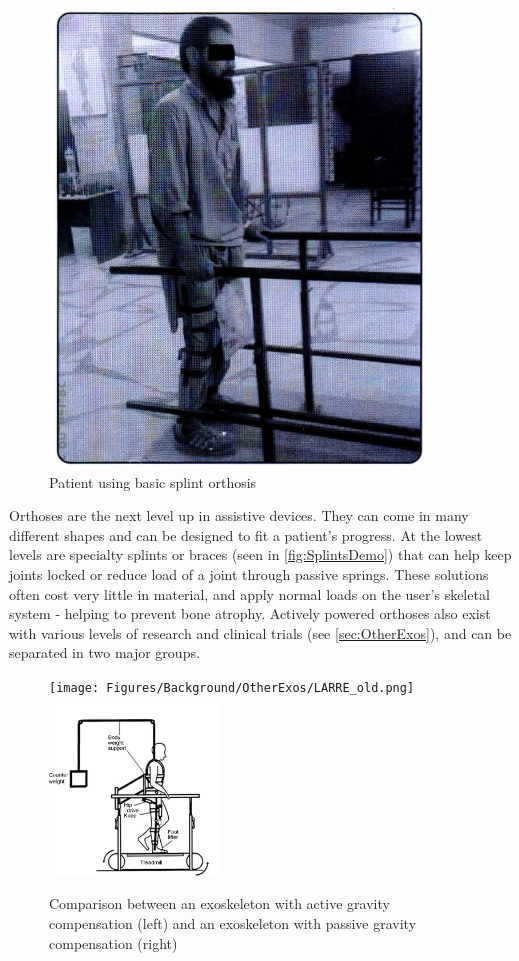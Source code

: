 \begin{figure} [ht!]
    \centering
    \includegraphics[width=0.4\linewidth]{Figures/Background/SplintsDemo.png}
    \caption{Patient using basic splint orthosis \cite{RehabParaplegia}}
    \label{fig:SplintsDemo}
\end{figure}

Orthoses are the next level up in assistive devices. They can come in many different shapes and can be designed to fit a patient's progress. At the lowest levels are specialty splints or braces (seen in \autoref{fig:SplintsDemo}) that can help keep joints locked or reduce load of a joint through passive springs. These solutions often cost very little in material, and apply normal loads on the user's skeletal system - helping to prevent bone atrophy. Actively powered orthoses also exist with various levels of research and clinical trials (see \autoref{sec:OtherExos}), and can be separated in two major groups. 

\begin{figure}[ht!]
    \centering
    \texttt{[image: Figures/Background/OtherExos/LARRE\_old.png]}
    \hspace*{10mm}
    \includegraphics[width=0.4\textwidth]{Figures/Background/ExoSeparateGravityComp.png}
    \caption{Comparison between an exoskeleton with active gravity compensation (left) and an exoskeleton with passive gravity compensation (right) \cite{GaitTrainingClinical}}
    \label{fig:ExoTypesGCSCompared}
\end{figure}

